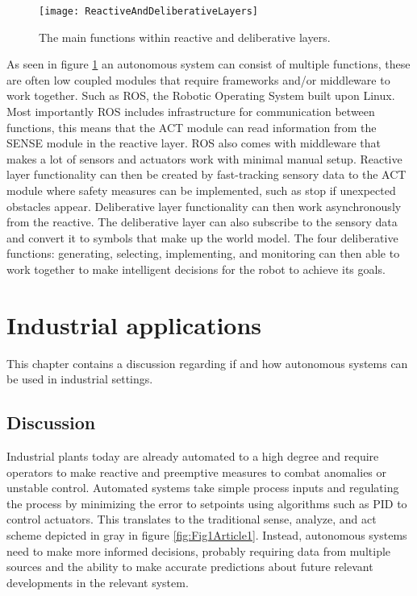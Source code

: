 \documentclass[%
oneside,    %
project,    %
nosummary   %
]{USN-MSc}
\begin{document}
\begin{figure}[!ht]
  \centering
  \texttt{[image: ReactiveAndDeliberativeLayers]}
  \caption{The main functions within reactive and deliberative layers.}
  \label{fig:ReactDelib}
\end{figure}

As seen in figure \ref{fig:ReactDelib} an autonomous system can consist of multiple functions, these are often low coupled modules that require frameworks and/or middleware to work together. Such as ROS, the Robotic Operating System built upon Linux. Most importantly ROS includes infrastructure for communication between functions, this means that the ACT module can read information from the SENSE module in the reactive layer. ROS also comes with middleware that makes a lot of sensors and actuators work with minimal manual setup. Reactive layer functionality can then be created by fast-tracking sensory data to the ACT module where safety measures can be implemented, such as stop if unexpected obstacles appear. Deliberative layer functionality can then work asynchronously from the reactive. The deliberative layer can also subscribe to the sensory data and convert it to symbols that make up the world model. The four deliberative functions: generating, selecting, implementing, and monitoring can then able to work together to make intelligent decisions for the robot to achieve its goals.

\chapter{Industrial applications}
\label{ch:induApp}
This chapter contains a discussion regarding if and how autonomous systems can be used in industrial settings.
\section{Discussion}
Industrial plants today are already automated to a high degree and require operators to make reactive and preemptive measures to combat anomalies or unstable control. Automated systems take simple process inputs and regulating the process by minimizing the error to setpoints using algorithms such as PID to control actuators. This translates to the traditional sense, analyze, and act scheme depicted in gray in figure \ref{fig:Fig1Article1}. Instead, autonomous systems need to make more informed decisions, probably requiring data from multiple sources and the ability to make accurate predictions about future relevant developments in the relevant system.
\end{document}
